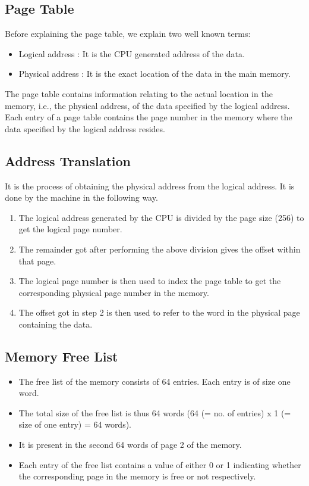 \documentclass[11pt]{article}
\begin{document}
\subsection{Page Table}
Before explaining the page table, we explain two well known terms:
\begin{itemize}
\item Logical address : It is the CPU generated address of the data.
\item Physical address : It is the exact location of the data in the main memory.
\end{itemize}

The page table contains information relating to the actual location in the memory, i.e., the physical address, of the data specified by the logical address. Each entry of a page table contains the page number in the memory where the data specified by the logical address resides. 


\subsection{Address Translation}
It is the process of obtaining the physical address from the logical address. It is done by the machine in the following way. 
\begin{enumerate}
\item The logical address generated by the CPU is divided by the page size (256) to get the logical page number.
\item The remainder got after performing the above division gives the offset within that page.
\item The logical page number is then used to index the page table to get the corresponding physical page number in the memory.
\item The offset got in step 2 is then used to refer to the word in the physical page containing the data.
\end{enumerate}


\subsection{Memory Free List}
\begin{itemize}
\item The free list of the memory consists of 64 entries. Each entry is of size one word.
\item The total size of the free list is thus 64 words (64 (= no. of entries) x 1 (= size of one entry) = 64 words).
\item It is present in the second 64 words of page 2 of the memory.
\item Each entry of the free list contains a value of either 0 or 1 indicating whether the corresponding page in the memory is free or not respectively.
\end{itemize}
\end{document}
